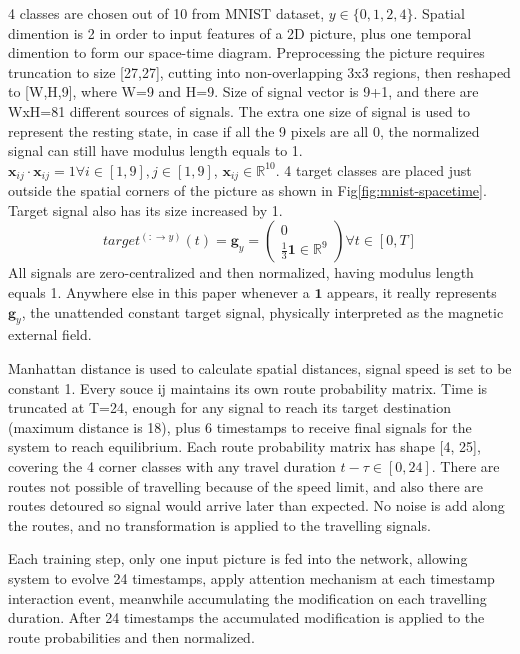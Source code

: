 \documentclass[11pt,a4paper]{article}
\begin{document}
\begin{multicols}{2}
4 classes are chosen out of 10 from MNIST dataset, $y \in \{0, 1, 2, 4 \}$. Spatial dimention is 2 in order to input features of a 2D picture, plus one temporal dimention to form our space-time diagram.
Preprocessing the picture requires truncation to size [27,27], cutting into non-overlapping 3x3 regions, then reshaped to [W,H,9], where W=9 and H=9. Size of signal vector is 9+1, and there are WxH=81 different sources of signals. 
The extra one size of signal is used to represent the resting state, in case if all the 9 pixels are all 0, the normalized signal can still have modulus length equals to 1. $\boldsymbol{x}_{ij} \cdot \boldsymbol{x}_{ij} = 1 \forall i \in [1, 9], j \in [1, 9]$, $\boldsymbol{x}_{ij} \in \mathbb{R}^{10}$.
 4 target classes are placed just outside the spatial corners of the picture as shown in Fig\ref{fig:mnist-spacetime}. 
Target signal also has its size increased by 1. 
$$target^{(:\rightarrow y)}(t) = \boldsymbol{g}_y = \begin{pmatrix} 0 \\ \frac{1}{3}\boldsymbol{1} \in \mathbb{R}^{9} \end{pmatrix} \forall t \in [0, T]$$
All signals are zero-centralized and then normalized, having modulus length equals 1. Anywhere else in this paper whenever a $\boldsymbol{1}$ appears, it really represents $\boldsymbol{g}_y$, the unattended constant target signal, physically interpreted as the magnetic external field.

Manhattan distance is used to calculate spatial distances, signal speed is set to be constant 1. Every souce ij maintains its own route probability matrix. Time is truncated at T=24, enough for any signal to reach its target destination (maximum distance is 18), 
plus 6 timestamps to receive final signals for the system to reach equilibrium. 
Each route probability matrix has shape [4, 25], covering the 4 corner classes with any travel duration $t-\tau \in [0, 24]$. There are routes not possible of travelling because of the speed limit, and also there are routes detoured so signal would arrive later than expected. 
No noise is add along the routes, and no transformation is applied to the travelling signals. 

Each training step, only one input picture is fed into the network, allowing system to evolve 24 timestamps, apply attention mechanism at each timestamp interaction event, meanwhile accumulating the modification on each travelling duration. After 24 timestamps the accumulated modification is applied to the route probabilities and then normalized. 


\end{multicols}
\end{document}
